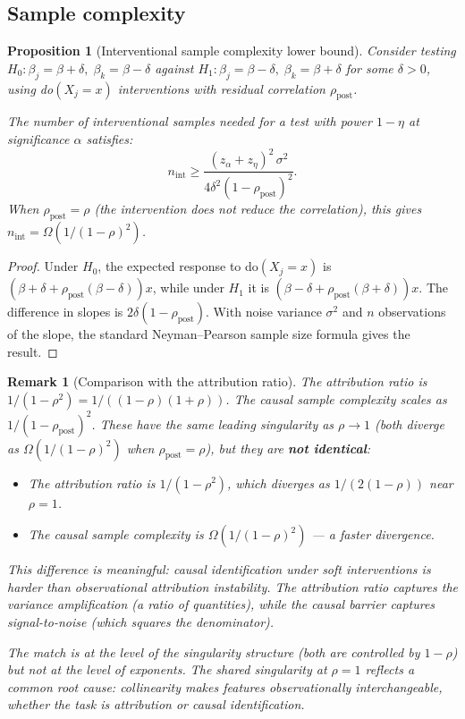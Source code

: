 \documentclass{article}
\newtheorem{proposition}[theorem]{Proposition}
\newtheorem{remark}[theorem]{Remark}
\begin{document}
\subsection{Sample complexity}

\begin{proposition}[Interventional sample complexity lower bound]
\label{prop:causal-sample-complexity}
Consider testing $H_0: \beta_j = \beta + \delta, \; \beta_k = \beta - \delta$
against $H_1: \beta_j = \beta - \delta, \; \beta_k = \beta + \delta$
for some $\delta > 0$, using do$(X_j = x)$ interventions
with residual correlation $\rho_{\mathrm{post}}$.

The number of interventional samples needed for a test with power
$1 - \eta$ at significance $\alpha$ satisfies:
\[
    n_{\mathrm{int}} \geq
    \frac{(z_\alpha + z_\eta)^2 \, \sigma^2}{4\delta^2 (1 - \rho_{\mathrm{post}})^2}.
\]
When $\rho_{\mathrm{post}} = \rho$ (the intervention does not
reduce the correlation), this gives
$n_{\mathrm{int}} = \Omega(1/(1-\rho)^2)$.
\end{proposition}

\begin{proof}
Under $H_0$, the expected response to do$(X_j = x)$ is
$(\beta + \delta + \rho_{\mathrm{post}}(\beta - \delta))x$, while
under $H_1$ it is
$(\beta - \delta + \rho_{\mathrm{post}}(\beta + \delta))x$.
The difference in slopes is
$2\delta(1 - \rho_{\mathrm{post}})$. With noise variance $\sigma^2$
and $n$ observations of the slope, the standard Neyman--Pearson
sample size formula gives the result.
\end{proof}

\begin{remark}[Comparison with the attribution ratio]
The attribution ratio is $1/(1-\rho^2) = 1/((1-\rho)(1+\rho))$.
The causal sample complexity scales as $1/(1-\rho_{\mathrm{post}})^2$.
These have the same leading singularity as $\rho \to 1$ (both
diverge as $\Omega(1/(1-\rho)^2)$ when $\rho_{\mathrm{post}} = \rho$),
but they are \textbf{not identical}:
\begin{itemize}
    \item The attribution ratio is $1/(1-\rho^2)$, which diverges
      as $1/(2(1-\rho))$ near $\rho = 1$.
    \item The causal sample complexity is $\Omega(1/(1-\rho)^2)$
      --- a \emph{faster} divergence.
\end{itemize}
This difference is meaningful: causal identification under soft
interventions is \emph{harder} than observational attribution
instability. The attribution ratio captures the \emph{variance
amplification} (a ratio of quantities), while the causal barrier
captures \emph{signal-to-noise} (which squares the denominator).

The match is at the level of the singularity structure (both are
controlled by $1-\rho$) but not at the level of exponents.
The shared singularity at $\rho = 1$ reflects a common root cause:
collinearity makes features observationally interchangeable, whether
the task is attribution or causal identification.
\end{remark}
\end{document}
